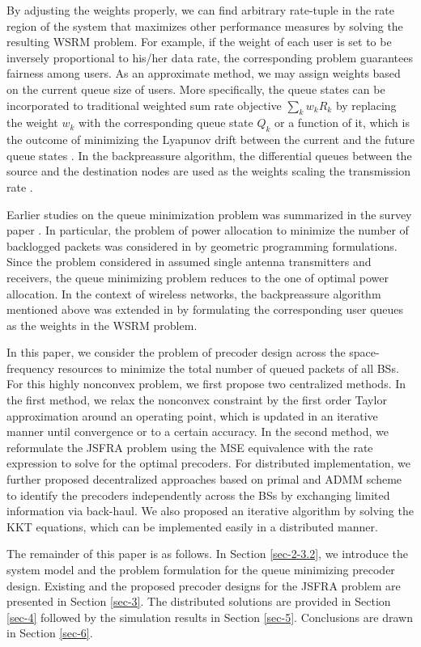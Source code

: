 By adjusting the weights properly, we can find arbitrary rate-tuple in the rate region of the system that maximizes other performance measures by solving the resulting WSRM problem. For example, if the weight of each user is set to be inversely proportional to his/her data rate, the corresponding problem guarantees fairness among users. As an approximate method, we may assign weights based on the current queue size of users. More specifically, the queue states can be incorporated to traditional weighted sum rate objective $\sum_k w_k R_k$ by replacing the weight $w_k$ with the corresponding queue state $Q_k$ or a function of it,  which is the outcome of minimizing the Lyapunov drift between the current and the future queue states \cite{tassiulas,neely2010stochastic}. In the backpreassure algorithm, the differential queues between the source and the destination nodes are used as the weights scaling the transmission rate \cite{georgiadis2006resource}.

Earlier studies on the queue minimization problem was summarized in the survey paper \cite{berry2004cross}. In particular, the problem of power allocation to minimize the number of backlogged packets was considered in \cite{qps_cioffi} by geometric programming formulations. Since the problem considered in \cite{qps_cioffi} assumed single antenna transmitters and receivers, the queue minimizing problem reduces to the one of optimal power allocation. In the context of wireless networks, the backpreassure algorithm mentioned above was extended in \cite{weeraddana2011resource} by formulating the corresponding user queues as the weights in the \ac{WSRM} problem.

In this paper, we consider the problem of precoder design across the space-frequency resources to minimize the total number of queued packets of all \acp{BS}. For this highly nonconvex problem, we first propose two centralized methods. In the first method, we relax the nonconvex constraint by the first order Taylor approximation around an operating point, which is updated in an iterative manner until convergence or to a certain accuracy. In the second method, we reformulate the \ac{JSFRA} problem using the \ac{MSE} equivalence with the rate expression to solve for the optimal precoders. For distributed implementation, we further proposed decentralized approaches based on primal and \ac{ADMM} scheme to identify the precoders independently across the \acp{BS} by exchanging limited information via back-haul. We also proposed an iterative algorithm by solving the \ac{KKT} equations, which can be implemented easily in a distributed manner.

The remainder of this paper is as follows. In Section \ref{sec-2-3.2}, we introduce the system model and the problem formulation for the queue minimizing precoder design. Existing and the proposed precoder designs for the \ac{JSFRA} problem are presented in Section \ref{sec-3}. The distributed solutions are provided in Section \ref{sec-4} followed by the simulation results in Section \ref{sec-5}. Conclusions are drawn in Section \ref{sec-6}.